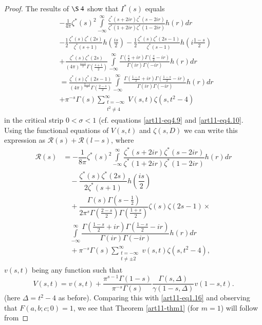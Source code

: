 \begin{proof}
The results of $\S~4$ show that $I^\ast (s)$ equals 
\begin{align*}
& -\frac{1}{4\pi} \zeta^\ast (s)^2 \int\limits^\infty_{-\infty} \frac{\zeta^\ast (s+ 2 ir) \zeta^{\ast} (s -2 ir)}{\zeta^\ast (1+2 ir ) \zeta^\ast (1 - 2 ir)} h (r) dr\\ 
& - \frac{1}{2} \frac{\zeta^\ast (s) \zeta^\ast (2s)}{\zeta^\ast (s+1)} h \left(\frac{is}{2} \right) - \frac{1}{2} \frac{\zeta^\ast (s) \zeta^\ast (2s-1)}{\zeta^\ast (s-1)} h \left(i \frac{1-s}{2} \right)\\
& + \frac{\zeta^\ast (s) \zeta^\ast (2s)}{(4 \pi)^{\frac{s+1}{2}} \Gamma \left(\frac{s+1}{2} \right)} \int\limits^{\infty}_{-\infty} \frac{\Gamma \left(\frac{s}{2} + ir \right) \Gamma \left(\frac{s}{2} - ir \right)}{\Gamma (ir) \Gamma (-ir)} h (r) dr\\
& = \frac{\zeta^\ast (s) \zeta^\ast (2s -1)}{(4 \pi)^{\frac{2-s}{2}} \Gamma\left(\frac{2-s}{2} \right)} \int\limits^\infty_{-\infty} \frac{\Gamma \left(\frac{1-s}{2} + ir \right) \Gamma \left(\frac{1-s}{2} -ir \right)}{ \Gamma (ir) \Gamma (-ir)} h (r) dr \\
& + \pi^{-s} \Gamma (s) \sum\limits^\infty_{\substack{t = -\infty\\ t^2\neq 4}} V (s,t) \zeta (s, t^2 -4)
\end{align*}\pageoriginale
in the critical strip $0<\sigma<1$ (cf. equations \eqref{art11-eq4.9} and \eqref{art11-eq4.10}. Using the functional equations of $V(s,t)$ and $\zeta(s,D)$ we can write this expression as $\mathscr{R}(s)+\mathscr{R}(l-s)$, where
\begin{align*}
\mathscr{R}(s) &= -\dfrac{1}{8\pi}\zeta^{*}(s)^{2} \int\limits^{\infty}_{-\infty}\dfrac{\zeta^{*}(s+2ir)\zeta^{*}(s-2ir)}{\zeta^{*}(1+2ir)\zeta^{*}(1-2ir)}h(r)dr\\
&\quad -\dfrac{\zeta^{*}(s)\zeta^{*}(2s)}{2\zeta^{*}(s+1)}h\left(\dfrac{is}{2}\right)\\
&\quad +\dfrac{\Gamma(s)\Gamma(s-\frac{1}{2})}{2\pi^{s}\Gamma\left(\frac{2-s}{2}\right)\Gamma\left(\frac{1+s}{2}\right)}\zeta(s)\zeta(2s-1)\times\\
&\quad \int\limits^{\infty}_{-\infty}\dfrac{\Gamma\left(\frac{1-s}{2}+ir\right)\Gamma\left(\frac{1-s}{2}-ir\right)}{\Gamma(ir)\Gamma(-ir)}h(r)dr\\
&\quad +\pi^{-s}\Gamma(s)\sum\limits^{\infty}_{\substack{t=-\infty\\ t\neq \pm 2}}v(s,t)\zeta(s,t^{2}-4),
\end{align*}
$v(s,t)$ being any function such that 
\begin{equation*}
V(s,t) = v(s,t) + \frac{\pi^{s-1} \Gamma (1-s)}{\pi^{-s} \Gamma (s)} \frac{\Gamma (s, \Delta)}{\gamma (1-s, \Delta)} v (1-s,t). 
\tag{5.2}\label{art11-eq5.2}
\end{equation*}
(here $\Delta = t^2 -4$ as before). Comparing this with \eqref{art11-eq1.16} and observing that $F(a,b; c;0) =1$, we see that Theorem \ref{art11-thm1} (for $m=1$) will follow from
\end{proof}

